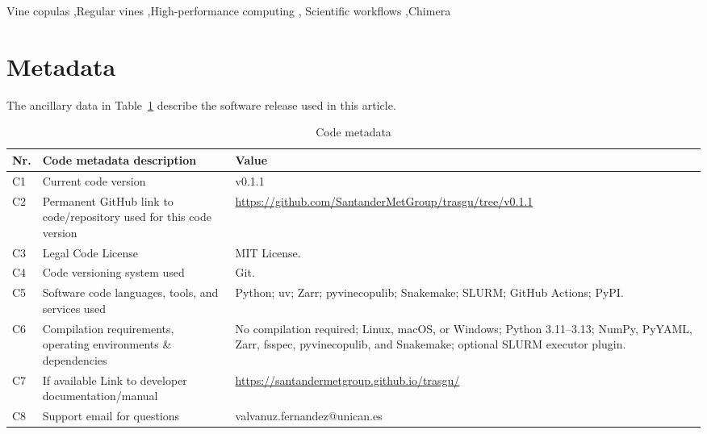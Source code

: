 \documentclass[preprint,12pt, a4paper]{elsarticle}
\begin{document}
\begin{frontmatter}
\begin{keyword}
Vine copulas \sep Regular vines \sep High-performance computing \sep
Scientific workflows \sep Chimera



\end{keyword}

\end{frontmatter}

\section*{Metadata}
\label{requiredMetadata}


The ancillary data in Table~\ref{codeMetadata} describe the software release
used in this article.

\begin{table}[!h]
\begin{tabular}{|l|p{5.85cm}|p{5.85cm}|}
\hline
\textbf{Nr.} & \textbf{Code metadata description} & \textbf{Value} \\
\hline
C1 & Current code version & v0.1.1 \\
\hline
C2 & Permanent GitHub link to code/repository used for this code version & \url{https://github.com/SantanderMetGroup/trasgu/tree/v0.1.1} \\
\hline
C3 & Legal Code License & MIT License. \\
\hline
C4 & Code versioning system used & Git. \\
\hline
C5 & Software code languages, tools, and services used & Python; uv; Zarr; pyvinecopulib; Snakemake; SLURM; GitHub Actions; PyPI. \\
\hline
C6 & Compilation requirements, operating environments \& dependencies & No compilation required; Linux, macOS, or Windows; Python 3.11--3.13; NumPy, PyYAML, Zarr, fsspec, pyvinecopulib, and Snakemake; optional SLURM executor plugin. \\
\hline
C7 & If available Link to developer documentation/manual & \url{https://santandermetgroup.github.io/trasgu/} \\
\hline
C8 & Support email for questions & valvanuz.fernandez@unican.es \\
\hline
\end{tabular}
\caption{Code metadata}
\label{codeMetadata} 
\end{table}
\end{document}

